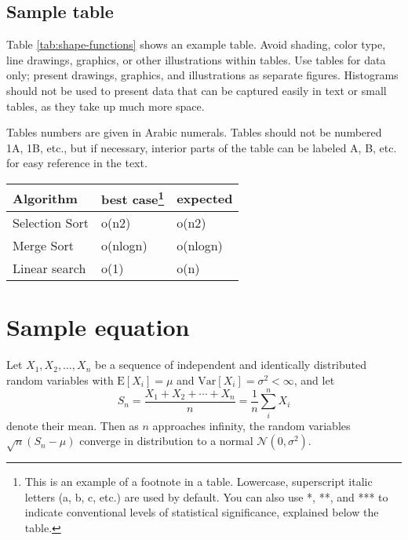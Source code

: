 \documentclass[9pt,twocolumn,twoside,lineno]{gsajnl}
\begin{document}
\subsection{Sample table}

Table \ref{tab:shape-functions} shows an example table. Avoid shading, color type, line drawings, graphics, or other illustrations within tables. Use tables for data only; present drawings, graphics, and illustrations as separate figures. Histograms should not be used to present data that can be captured easily in text or small tables, as they take up much more space.

Tables numbers are given in Arabic numerals. Tables should not be numbered 1A, 1B, etc., but if necessary, interior parts of the table can be labeled A, B, etc. for easy reference in the text.

\begin{table*}[p]
\centering
\caption{Sample table}
\begin{tableminipage}{\textwidth}
\begin{tabularx}{\textwidth}{@{}XXX@{}}
\hline
{\bf Algorithm } & {\bf best case}\footnote{This is an example of a footnote in a table. Lowercase, superscript italic letters (a, b, c, etc.) are used by default. You can also use *, **, and *** to indicate conventional levels of statistical significance, explained below the table.} & {\bf expected}   \\
\hline
Selection Sort & o(n2)\ & o(n2) \\
Merge Sort & o(nlogn)\ & o(nlogn) \\
Linear search & o(1)\ & o(n)\\
\hline
\end{tabularx}
  \label{tab:shape-functions}
\end{tableminipage}
\end{table*}

\section{Sample equation}

Let $X_1, X_2, \ldots, X_n$ be a sequence of independent and identically distributed random variables with $\text{E}[X_i] = \mu$ and $\text{Var}[X_i] = \sigma^2 < \infty$, and let
\begin{equation}
S_n = \frac{X_1 + X_2 + \cdots + X_n}{n}
      = \frac{1}{n}\sum_{i}^{n} X_i
\label{eq:refname1}
\end{equation}
denote their mean. Then as $n$ approaches infinity, the random variables $\sqrt{n}(S_n - \mu)$ converge in distribution to a normal $\mathcal{N}(0, \sigma^2)$.
\end{document}

